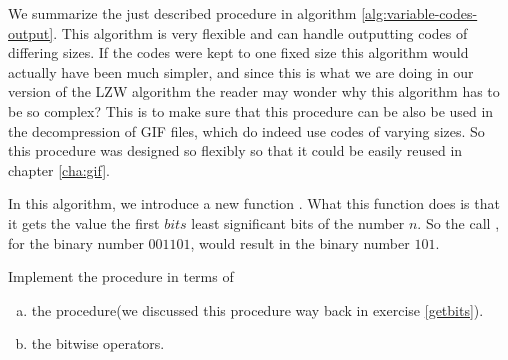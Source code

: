 We summarize the just described procedure in algorithm
\ref{alg:variable-codes-output}. This algorithm is very flexible and
can handle outputting codes of differing sizes. If the codes were kept
to one fixed size this algorithm would actually have been much
simpler, and since this is what we are doing in our version of the LZW
algorithm the reader may wonder why this algorithm has to be so
complex?  This is to make sure that this procedure can be also be used
in the decompression of GIF files, which do indeed use codes of
varying sizes. So this procedure was designed so flexibly so that it
could be easily reused in chapter \ref{cha:gif}.

In this algorithm, we introduce a new function
. What this function does
is that it gets the value the first $bits$ least significant bits of
the number $n$. So the call , for the
binary number $001101$, would result in the binary number $101$.

\begin{Exercise}[label={firstnbits}]

  Implement the  procedure in terms of

  \begin{enumerate}[(a)]
  \item the  procedure(we discussed this procedure
    way back in exercise \ref{getbits}).
  \item the bitwise operators.
  \end{enumerate}

\end{Exercise}

